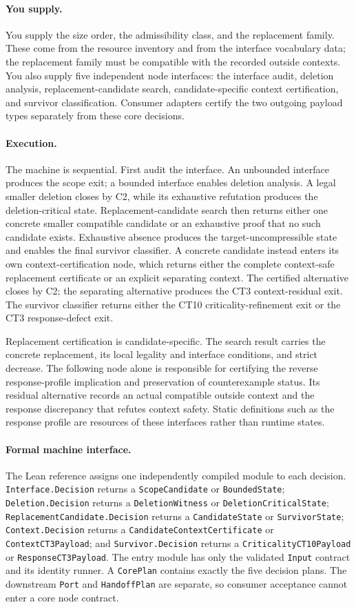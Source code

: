 \documentclass[
  11pt,
]{article}
\theoremstyle{definition}
\newcommand{\ctpar}[1]{\paragraph{#1.}}
\begin{document}
\ctpar{You supply}
You supply the size order, the admissibility class, and the replacement
family.  These come from the resource inventory and from the interface
vocabulary data; the replacement family must be compatible with the
recorded outside contexts.  You also supply five independent node
interfaces: the interface audit, deletion analysis, replacement-candidate
search, candidate-specific context certification, and survivor
classification.  Consumer adapters certify the two outgoing payload types
separately from these core decisions.

\ctpar{Execution}
The machine is sequential.  First audit the interface.  An unbounded
interface produces the scope exit; a bounded interface enables deletion
analysis.  A legal smaller deletion closes by C2, while its exhaustive
refutation produces the deletion-critical state.  Replacement-candidate
search then returns either one concrete smaller compatible candidate or an
exhaustive proof that no such candidate exists.  Exhaustive absence produces
the target-uncompressible state and enables the final survivor classifier.
A concrete candidate instead enters its own context-certification node,
which returns either the complete context-safe replacement certificate or
an explicit separating context.  The certified alternative closes by C2;
the separating alternative produces the CT3 context-residual exit.  The
survivor classifier returns either the CT10 criticality-refinement exit or
the CT3 response-defect exit.

Replacement certification is candidate-specific.  The search result carries
the concrete replacement, its local legality and interface conditions, and
strict decrease.  The following node alone is responsible for certifying
the reverse response-profile implication and preservation of counterexample
status.  Its residual alternative records an actual compatible outside
context and the response discrepancy that refutes context safety.  Static
definitions such as the response profile are resources of these interfaces
rather than runtime states.

\ctpar{Formal machine interface}
The Lean reference assigns one independently compiled module to each
decision.  \texttt{Interface.Decision} returns a \texttt{ScopeCandidate}
or \texttt{BoundedState}; \texttt{Deletion.Decision} returns a
\texttt{DeletionWitness} or \texttt{DeletionCritical\allowbreak{}State};
\texttt{ReplacementCandidate.\allowbreak{}Decision} returns a \texttt{CandidateState}
or \texttt{SurvivorState}; \texttt{Context.Decision} returns a
\texttt{CandidateContext\allowbreak{}Certificate} or \texttt{ContextCT3\allowbreak{}Payload}; and
\texttt{Survivor.Decision} returns a \texttt{CriticalityCT10\allowbreak{}Payload} or
\texttt{ResponseCT3\allowbreak{}Payload}.  The entry module has only the validated
\texttt{Input} contract and its identity runner.  A \texttt{CorePlan}
contains exactly the five decision plans.  The downstream \texttt{Port}
and \texttt{HandoffPlan} are separate, so consumer acceptance cannot enter
a core node contract.
\end{document}
